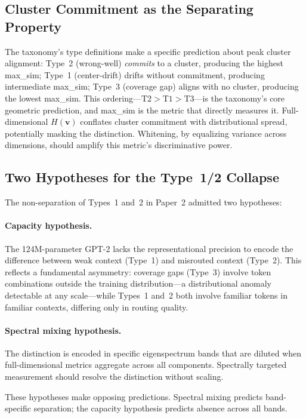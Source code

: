\documentclass[11pt]{article}
\newcommand{\Hv}{H(\mathbf{v})}
\begin{document}
\subsection{Cluster Commitment as the Separating Property}

The taxonomy's type definitions make a specific prediction about peak cluster alignment: Type~2 (wrong-well) \textit{commits} to a cluster, producing the highest max\_sim; Type~1 (center-drift) drifts without commitment, producing intermediate max\_sim; Type~3 (coverage gap) aligns with no cluster, producing the lowest max\_sim. This ordering---$\text{T2} > \text{T1} > \text{T3}$---is the taxonomy's core geometric prediction, and max\_sim is the metric that directly measures it. Full-dimensional $\Hv$ conflates cluster commitment with distributional spread, potentially masking the distinction. Whitening, by equalizing variance across dimensions, should amplify this metric's discriminative power.

\subsection{Two Hypotheses for the Type~1/2 Collapse}

The non-separation of Types~1 and~2 in Paper~2 admitted two hypotheses:

\paragraph{Capacity hypothesis.} The 124M-parameter GPT-2 lacks the representational precision to encode the difference between weak context (Type~1) and misrouted context (Type~2). This reflects a fundamental asymmetry: coverage gaps (Type~3) involve token combinations outside the training distribution---a distributional anomaly detectable at any scale---while Types~1 and~2 both involve familiar tokens in familiar contexts, differing only in routing quality.

\paragraph{Spectral mixing hypothesis.} The distinction is encoded in specific eigenspectrum bands that are diluted when full-dimensional metrics aggregate across all components. Spectrally targeted measurement should resolve the distinction without scaling.

These hypotheses make opposing predictions. Spectral mixing predicts band-specific separation; the capacity hypothesis predicts absence across all bands.
\end{document}
